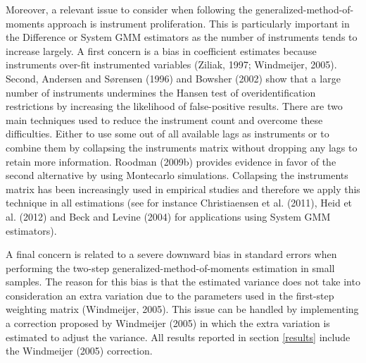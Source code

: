 \documentclass[12pt,a4paper,english]{article}%
\begin{document}
Moreover, a relevant issue to consider when following the generalized-method-of-moments approach is instrument proliferation. This is particularly important in the Difference or System GMM estimators as the number of instruments tends to increase largely. A first concern is a bias in coefficient estimates because instruments over-fit instrumented variables (Ziliak, 1997; Windmeijer, 2005). Second, Andersen and S\o rensen (1996) and Bowsher (2002) show that a large number of instruments undermines the Hansen test of overidentification restrictions by increasing the likelihood of false-positive results. There are two main techniques used to reduce the instrument count and overcome these difficulties. Either to use some out of all available lags as instruments or to combine them by collapsing the instruments matrix without dropping any lags to retain more information. Roodman (2009b) provides evidence in favor of the second alternative by using Montecarlo simulations. Collapsing the instruments matrix has been increasingly used in empirical studies and therefore we apply this technique in all estimations (see for instance Christiaensen et al. (2011), Heid et al. (2012) and Beck and Levine (2004) for applications using System GMM estimators).

A final concern is related to a severe downward bias in standard errors when performing the two-step generalized-method-of-moments estimation in small samples. The reason for this bias is that the estimated variance does not take into consideration an extra variation due to the parameters used in the first-step weighting matrix (Windmeijer, 2005). This issue can be handled by implementing a correction proposed by Windmeijer (2005) in which the extra variation is estimated to adjust the variance. All results reported in section \ref{results} include the Windmeijer (2005) correction.

\newpage
\end{document}
